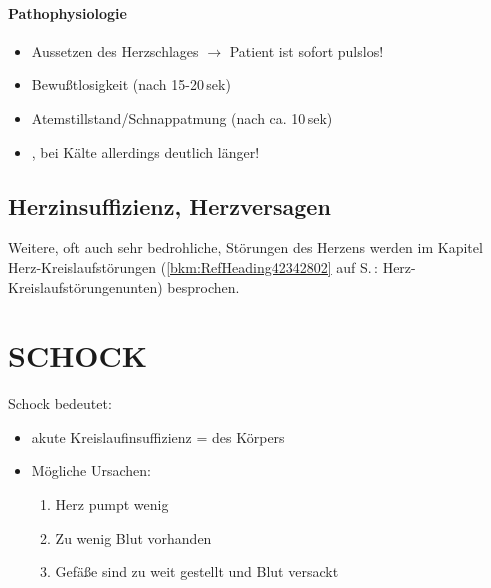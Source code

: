 \paragraph{Pathophysiologie}

\begin{itemize}
\item Aussetzen des Herzschlages $\rightarrow$ Patient ist
sofort pulslos!
\item Bewu{\ss}tlosigkeit (nach 15-20\,sek)
\item Atemstillstand/Schnappatmung (nach ca. 10\,sek)
\item {}, bei
K\"alte allerdings deutlich l\"anger!
\end{itemize}











\subsection{Herzinsuffizienz, Herzversagen}

Weitere, oft auch sehr bedrohliche, St\"orungen des Herzens werden im
Kapitel  Herz-Kreislaufst\"orungen 
(\ref{bkm:RefHeading42342802}
auf S.\,\pageref{bkm:RefHeading42342802}:
{\quotedblbase}Herz-Kreislaufst\"orungenunten{\quotedblbase}) besprochen.

\section{SCHOCK}





Schock bedeutet:

\begin{itemize}
    \item akute Kreislaufinsuffizienz = 
    des K\"orpers
    \item M\"ogliche Ursachen:
    \begin{enumerate}
        \item Herz pumpt wenig
        \item Zu wenig Blut vorhanden
        \item Gef\"a{\ss}e sind zu weit gestellt und Blut versackt
    \end{enumerate}
\end{itemize}

